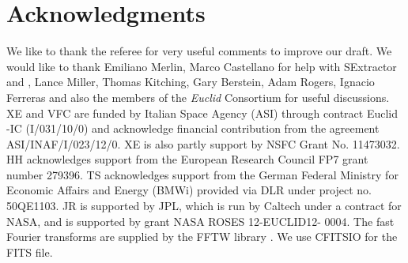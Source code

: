 \documentclass[useAMS,usenatbib]{mnras}
\begin{document}

\section*{Acknowledgments}

We like to thank the referee for very useful comments to improve our draft.
We would like to thank Emiliano Merlin, Marco Castellano for help with
{\sc SExtractor} and {}, Lance Miller, Thomas
Kitching, Gary Berstein, Adam Rogers, Ignacio Ferreras and also the
members of the {\it Euclid} Consortium for useful discussions. XE and VFC are
funded by Italian Space Agency (ASI) through contract Euclid -IC
(I/031/10/0) and acknowledge financial contribution from the agreement
ASI/INAF/I/023/12/0. XE is also partly support by NSFC Grant
No. 11473032. HH acknowledges support from the European Research
Council FP7 grant number 279396. TS acknowledges support from the
German Federal Ministry for Economic Affairs and Energy (BMWi)
provided via DLR under project no. 50QE1103.  JR is supported by JPL,
which is run by Caltech under a contract for NASA, and is supported by
grant NASA ROSES 12-EUCLID12- 0004. The fast Fourier transforms are
supplied by the FFTW library \citep{fftw05}. We use CFITSIO
\citep{1999ASPC..172..487P} for the FITS file.



\end{document}
